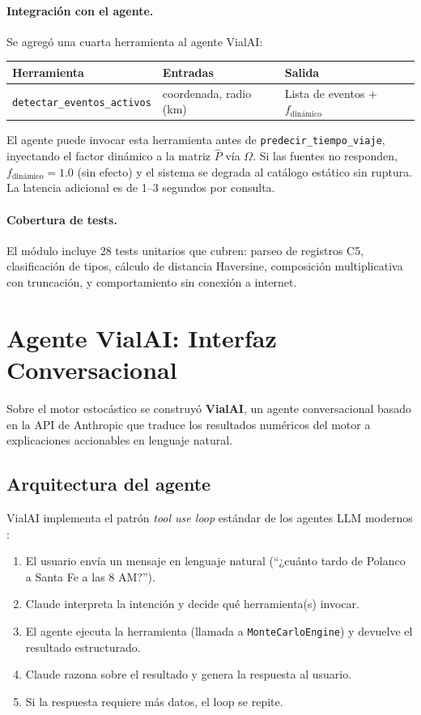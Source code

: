 \documentclass[11pt,a4paper]{article}
\begin{document}
\paragraph{Integración con el agente.}
Se agregó una cuarta herramienta al agente VialAI:

\begin{center}
\small
\begin{tabular}{lll}
\toprule
\textbf{Herramienta} & \textbf{Entradas} & \textbf{Salida} \\
\midrule
\texttt{detectar\_eventos\_activos} & coordenada, radio (km) & Lista de eventos $+$ $f_{\text{dinámico}}$ \\
\bottomrule
\end{tabular}
\end{center}

El agente puede invocar esta herramienta antes de \texttt{predecir\_tiempo\_viaje}, inyectando el factor dinámico a la matriz $\hat{P}$ vía $\Omega$. Si las fuentes no responden, $f_{\text{dinámico}} = 1.0$ (sin efecto) y el sistema se degrada al catálogo estático sin ruptura. La latencia adicional es de 1--3 segundos por consulta.

\paragraph{Cobertura de tests.}
El módulo incluye 28 tests unitarios que cubren: parseo de registros C5, clasificación de tipos, cálculo de distancia Haversine, composición multiplicativa con truncación, y comportamiento sin conexión a internet.

\section{Agente VialAI: Interfaz Conversacional}

Sobre el motor estocástico se construyó \textbf{VialAI}, un agente conversacional basado en la API de Anthropic que traduce los resultados numéricos del motor a explicaciones accionables en lenguaje natural.

\subsection{Arquitectura del agente}

VialAI implementa el patrón \textit{tool use loop} estándar de los agentes LLM modernos \cite{anthropic2024}:
\begin{enumerate}[leftmargin=*,noitemsep]
\item El usuario envía un mensaje en lenguaje natural (``¿cuánto tardo de Polanco a Santa Fe a las 8 AM?'').
\item Claude interpreta la intención y decide qué herramienta(s) invocar.
\item El agente ejecuta la herramienta (llamada a \texttt{MonteCarloEngine}) y devuelve el resultado estructurado.
\item Claude razona sobre el resultado y genera la respuesta al usuario.
\item Si la respuesta requiere más datos, el loop se repite.
\end{enumerate}
\end{document}
